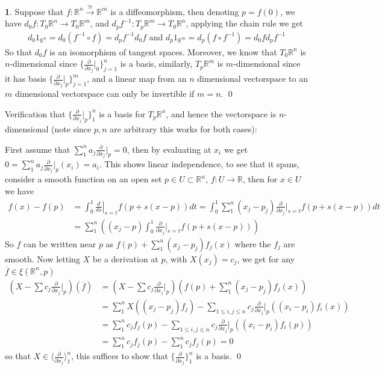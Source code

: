 \documentclass[10.5pt]{article}
\theoremstyle{definition}
\newtheorem{pb}{}
\newcommand{\set}[1]{\{#1\}}
\newcommand{\gen}[1]{\langle#1\rangle}
\newcommand{\tand}{\text{ and }}
\newcommand{\pd}{\frac{\partial}{\partial x_j}}
\begin{document}
    \begin{pb}
        Suppose that \(f: \mathbb{R}^n \overset{\cong}{\to} \mathbb{R}^m\) is a diffeomorphism, then denoting \(p = f(0)\), we have \(d_0f: T_0 \mathbb{R}^n \to T_0 \mathbb{R}^m\), and \(d_pf^{-1}: T_p \mathbb{R}^m \to T_0 \mathbb{R}^n\), applying the chain rule we get
        \begin{align*}
            d_0 1_{\mathbb{R}^n} = d_0(f^{-1}\circ f) = d_{p}f^{-1} d_0 f \tand d_p 1_{\mathbb{R}^m} = d_p (f \circ f^{-1}) = d_0f d_p f^{-1}
        \end{align*}
        So that \(d_0f\) is an isomorphism of tangent spaces. Moreover, we know that \(T_0 \mathbb{R}^n\) is \(n\)-dimensional since \(\set{\pd\vert_0}_{j=1}^n\) is a basis, similarly, \(T_p \mathbb{R}^m\) is \(m\)-dimensional since it has basis \(\set{\pd\vert_p}_{j=1}^m\), and a linear map from an \(n\) dimensional vectorspace to an \(m\) dimensional vectorspace can only be invertible if \(m = n\). \qed

        Verification that \(\set{\pd \vert_p}_1^n\) is a basis for \(T_p \mathbb{R}^n\), and hence the vectorspace is \(n\)-dimensional (note since \(p,n\) are arbitrary this works for both cases):

        First assume that \(\sum_1^n a_j\pd\vert_p = 0\), then by evaluating at \(x_i\) we get \(0 = \sum_1^n a_j\pd\vert_p (x_i) = a_i\). This shows linear independence, to see that it spans, consider a smooth function on an open set \(p \in U \subset \mathbb{R}^n\), \(f: U \to \mathbb{R}\), then for \(x \in U\) we have
        \begin{align*}
            f(x) - f(p) &= \int_0^1\left. \frac{d}{ds}\right\vert_{s=t}f(p + s(x-p))dt = \int_0^1 \sum_1^n (x_j - p_j) \pd \vert_{s=t} f(p + s(x-p))dt \\ 
            &= \sum_1^n \left((x_j - p)\int_0^1 \pd\vert_{s=t}f(p + s(x-p)) \right)
        \end{align*}
        So \(f\) can be written near \(p\) as \(f(p) + \sum_1^n (x_j-p_j)f_j(x)\) where the \(f_j\) are smooth.
        Now letting \(X\) be a derivation at \(p\), with \(X(x_j) = c_j\), we get for any \(\overline{f} \in \xi(\mathbb{R}^n,p)\)
        \begin{align*}
            \left(X - \sum c_j \pd\vert_p\right)(\overline{f}) &= \left(X - \sum c_j \pd\vert_p\right)\left(f(p) + \sum_1^n (x_j-p_j)f_j(x)\right) \\
            &= \sum_1^n X((x_j - p_j)f_j) - \sum_{1 \leq i,j \leq n}c_j\pd\vert_p ((x_i-p_i)f_i(x)) \\
            &= \sum_1^n c_jf_j(p) - \sum_{1 \leq i,j \leq n} c_j \pd\vert_p ((x_i - p_i)f_i(p)) \\
            &= \sum_1^n c_jf_j(p) - \sum_1^n c_jf_j(p) = 0
        \end{align*}
        so that \(X \in \gen{\pd}_1^n\), this suffices to show that \(\set{\pd}_1^n\) is a basis. \qed
    \end{pb}
\end{document}
